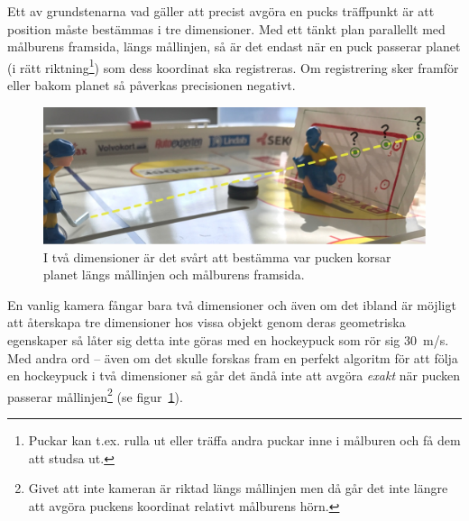 \documentclass[a4paper,12pt]{article}
\begin{document}
Ett av grundstenarna vad gäller att precist avgöra en pucks träffpunkt är
att position måste bestämmas i tre dimensioner. Med ett tänkt plan parallellt
med målburens framsida, längs mållinjen, så är det endast när en puck passerar
planet (i rätt riktning\footnote{Puckar kan t.ex. rulla ut eller träffa andra
puckar inne i målburen och få dem att studsa ut.}) som dess koordinat ska
registreras. Om registrering sker framför eller bakom planet så påverkas
precisionen negativt.

\begin{figure}[ht]
  \centering
  \includegraphics[width=\linewidth]{photos/3d-problem-two.jpg}
  \caption{I två dimensioner är det svårt att bestämma var pucken korsar
    planet längs mållinjen och målburens framsida.
  \label{fig:3d-problem2}}
\end{figure}

En vanlig kamera fångar bara två dimensioner och även om det ibland är möjligt
att återskapa tre dimensioner hos vissa objekt genom deras geometriska
egenskaper så låter sig detta inte göras med en hockeypuck som rör sig 30~m/s.
Med andra ord -- även om det skulle forskas fram en perfekt algoritm för att
följa en hockeypuck i två dimensioner så går det ändå inte att avgöra
\textit{exakt} när pucken passerar mållinjen\footnote{Givet att inte kameran
är riktad längs mållinjen men då går det inte längre att avgöra puckens
koordinat relativt målburens hörn.} (se figur~\ref{fig:3d-problem2}).
\end{document}

